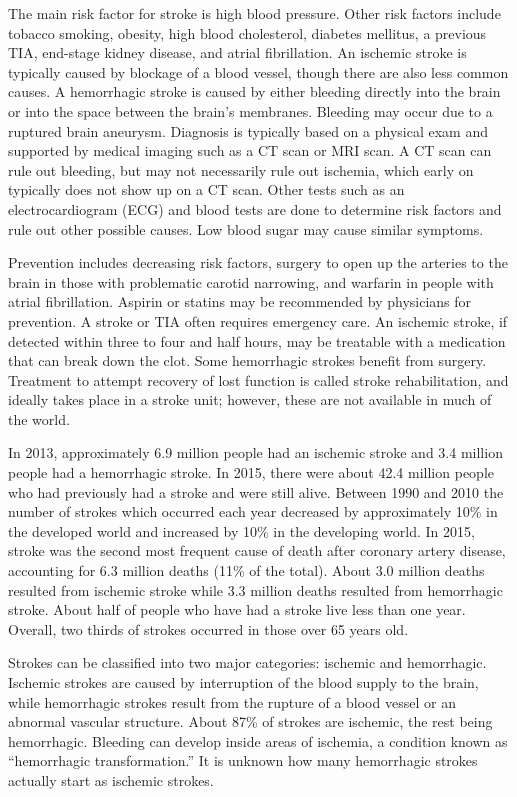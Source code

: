 The main risk factor for stroke is high blood pressure. Other risk
factors include tobacco smoking, obesity, high blood cholesterol,
diabetes mellitus, a previous TIA, end-stage kidney disease, and atrial
fibrillation. An ischemic stroke is typically caused by blockage of a
blood vessel, though there are also less common causes. A hemorrhagic
stroke is caused by either bleeding directly into the brain or into the
space between the brain's membranes. Bleeding may occur due to a
ruptured brain aneurysm. Diagnosis is typically based on a physical exam
and supported by medical imaging such as a CT scan or MRI scan. A CT
scan can rule out bleeding, but may not necessarily rule out ischemia,
which early on typically does not show up on a CT scan. Other tests such
as an electrocardiogram (ECG) and blood tests are done to determine risk
factors and rule out other possible causes. Low blood sugar may cause
similar symptoms.

Prevention includes decreasing risk factors, surgery to open up the
arteries to the brain in those with problematic carotid narrowing, and
warfarin in people with atrial fibrillation. Aspirin or statins may be
recommended by physicians for prevention. A stroke or TIA often requires
emergency care. An ischemic stroke, if detected within three to four and
half hours, may be treatable with a medication that can break down the
clot. Some hemorrhagic strokes benefit from surgery. Treatment to
attempt recovery of lost function is called stroke rehabilitation, and
ideally takes place in a stroke unit; however, these are not available
in much of the world.

In 2013, approximately 6.9 million people had an ischemic stroke and 3.4
million people had a hemorrhagic stroke. In 2015, there were about 42.4
million people who had previously had a stroke and were still alive.
Between 1990 and 2010 the number of strokes which occurred each year
decreased by approximately 10\% in the developed world and increased by
10\% in the developing world. In 2015, stroke was the second most
frequent cause of death after coronary artery disease, accounting for
6.3 million deaths (11\% of the total). About 3.0 million deaths
resulted from ischemic stroke while 3.3 million deaths resulted from
hemorrhagic stroke. About half of people who have had a stroke live less
than one year. Overall, two thirds of strokes occurred in those over 65
years old.

Strokes can be classified into two major categories: ischemic and
hemorrhagic. Ischemic strokes are caused by interruption of the blood
supply to the brain, while hemorrhagic strokes result from the rupture
of a blood vessel or an abnormal vascular structure. About 87\% of
strokes are ischemic, the rest being hemorrhagic. Bleeding can develop
inside areas of ischemia, a condition known as ``hemorrhagic
transformation.'' It is unknown how many hemorrhagic strokes actually
start as ischemic strokes.

